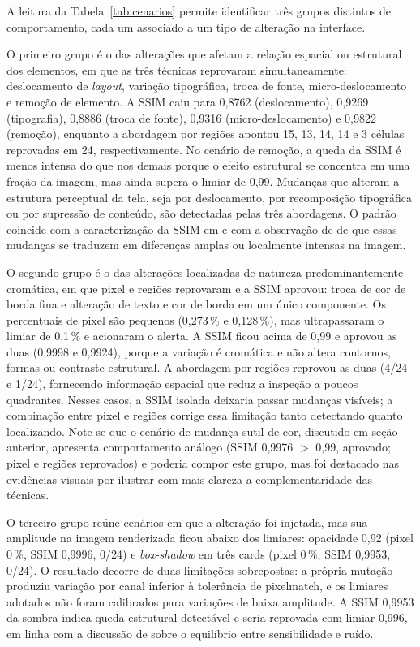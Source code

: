 \documentclass{UNESC}
\begin{document}
A leitura da Tabela~\ref{tab:cenarios} permite identificar três grupos distintos de comportamento, cada um associado a um tipo de alteração na interface.

O primeiro grupo é o das alterações que afetam a relação espacial ou estrutural dos elementos, em que as três técnicas reprovaram simultaneamente: deslocamento de \emph{layout}, variação tipográfica, troca de fonte, micro-deslocamento e remoção de elemento. A SSIM caiu para 0,8762 (deslocamento), 0,9269 (tipografia), 0,8886 (troca de fonte), 0,9316 (micro-deslocamento) e 0,9822 (remoção), enquanto a abordagem por regiões apontou 15, 13, 14, 14 e 3 células reprovadas em 24, respectivamente. No cenário de remoção, a queda da SSIM é menos intensa do que nos demais porque o efeito estrutural se concentra em uma fração da imagem, mas ainda supera o limiar de 0,99. Mudanças que alteram a estrutura perceptual da tela, seja por deslocamento, por recomposição tipográfica ou por supressão de conteúdo, são detectadas pelas três abordagens. O padrão coincide com a caracterização da SSIM em  e com a observação de  de que essas mudanças se traduzem em diferenças amplas ou localmente intensas na imagem.

O segundo grupo é o das alterações localizadas de natureza predominantemente cromática, em que pixel e regiões reprovaram e a SSIM aprovou: troca de cor de borda fina e alteração de texto e cor de borda em um único componente. Os percentuais de pixel são pequenos (0,273\,\% e 0,128\,\%), mas ultrapassaram o limiar de 0,1\,\% e acionaram o alerta. A SSIM ficou acima de 0,99 e aprovou as duas (0,9998 e 0,9924), porque a variação é cromática e não altera contornos, formas ou contraste estrutural. A abordagem por regiões reprovou as duas (4/24 e 1/24), fornecendo informação espacial que reduz a inspeção a poucos quadrantes. Nesses casos, a SSIM isolada deixaria passar mudanças visíveis; a combinação entre pixel e regiões corrige essa limitação tanto detectando quanto localizando. Note-se que o cenário de mudança sutil de cor, discutido em seção anterior, apresenta comportamento análogo (SSIM 0,9976 $>$ 0,99, aprovado; pixel e regiões reprovados) e poderia compor este grupo, mas foi destacado nas evidências visuais por ilustrar com mais clareza a complementaridade das técnicas.

O terceiro grupo reúne cenários em que a alteração foi injetada, mas sua amplitude na imagem renderizada ficou abaixo dos limiares: opacidade 0,92 (pixel 0\,\%, SSIM 0,9996, 0/24) e \emph{box-shadow} em três cards (pixel 0\,\%, SSIM 0,9953, 0/24). O resultado decorre de duas limitações sobrepostas: a própria mutação produziu variação por canal inferior à tolerância de pixelmatch, e os limiares adotados não foram calibrados para variações de baixa amplitude. A SSIM 0,9953 da sombra indica queda estrutural detectável e seria reprovada com limiar 0,996, em linha com a discussão de  sobre o equilíbrio entre sensibilidade e ruído.
\end{document}
